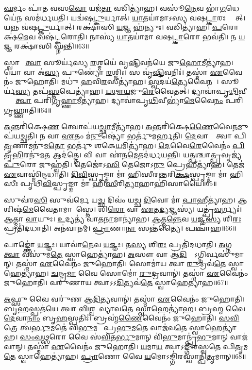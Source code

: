 \ul{𑌘}𑌰𑍍𑌮𑌂 𑌪𑌾॑𑌤 𑌵𑌸\ul{𑌵𑍋} 𑌯𑌜॑\ul{𑌤𑌾} 𑌵𑌡𑌿𑌤𑍍𑌯𑌾॑𑌹। 
𑌵𑌸𑍂॑\ul{𑌨𑍇}𑌵 𑌭𑌾॑\ul{𑌗}𑌧𑍇𑌯𑍇॑\ul{𑌨} 𑌸𑌮॑𑌰𑍍𑌧𑌯𑌤𑌿। 
𑌯𑌦𑍍𑌵॑𑌷\ul{𑌟𑍍𑌕𑍁}𑌰𑍍𑌯𑌾𑌤𑍍। 
\ul{𑌯𑌾}𑌤𑌯𑌾॑𑌮𑌾𑌽𑌸𑍍𑌯 𑌵𑌷\ul{𑌟𑍍𑌕𑌾}𑌰𑌃 𑌸𑍍𑌯𑌾᳚𑌤𑍍। 
𑌯𑌨𑍍𑌨 𑌵॑𑌷\ul{𑌟𑍍𑌕𑍁}𑌰𑍍𑌯𑌾𑌤𑍍। 
𑌰𑌕𑍍𑌷𑌾॑𑌸𑌿 \ul{𑌯}𑌜𑍍𑌞 𑌹॑𑌨𑍍𑌯𑍁𑌃। 
𑌵𑌡𑌿𑌤𑍍𑌯𑌾॑𑌹। 
\ul{𑌪}𑌰𑍋𑌕𑍍𑌷॑\ul{𑌮𑍇}𑌵 𑌵𑌷॑𑌟𑍍𑌕𑌰𑍋𑌤𑌿। 
𑌨𑌾𑌸𑍍𑌯॑ \ul{𑌯𑌾}𑌤𑌯𑌾॑𑌮𑌾 𑌵𑌷\ul{𑌟𑍍𑌕𑌾}𑌰𑍋 𑌭𑌵॑𑌤𑌿। 
𑌨 \ul{𑌯}𑌜𑍍𑌞 𑌰𑌕𑍍𑌷𑌾॑𑌸𑌿 𑌘𑍍𑌨𑌨𑍍𑌤𑌿॥63॥

𑌸𑍍𑌵𑌾𑌹𑌾᳚ \ul{𑌤𑍍𑌵𑌾} 𑌸𑍂𑌰𑍍𑌯॑𑌸𑍍𑌯 \ul{𑌰}𑌶𑍍𑌮𑌯𑍇॑ 𑌵𑍃\ul{𑌷𑍍𑌟𑌿}𑌵𑌨॑𑌯𑍇 𑌜𑍁\ul{𑌹𑍋}𑌮𑍀𑌤𑍍𑌯𑌾॑𑌹। 
𑌯𑍋 𑌵𑌾 𑌅॑\ul{𑌸𑍍𑌯} 𑌪𑍁𑌣𑍍𑌯𑍋॑ \ul{𑌰}𑌶𑍍𑌮𑌿𑌃। 
𑌸 𑌵𑍃॑\ul{𑌷𑍍𑌟𑌿}𑌵𑌨𑌿𑌃॑। 
𑌤𑌸𑍍𑌮𑌾॑ \ul{𑌏}𑌵𑍈𑌨𑌂॑ 𑌜𑍁𑌹𑍋𑌤𑌿। 
𑌮𑌧𑍁॑ \ul{𑌹}𑌵𑌿\ul{𑌰}𑌸𑍀𑌤𑍍𑌯𑌾॑𑌹। 
\ul{𑌸𑍍𑌵}𑌦𑌯॑\ul{𑌤𑍍𑌯𑍇}𑌵𑍈𑌨𑌮𑍍᳚। 
𑌸𑍂𑌰𑍍𑌯॑\ul{𑌸𑍍𑌯} 𑌤𑌪॑\ul{𑌸𑍍𑌤}𑌪𑍇𑌤𑍍𑌯𑌾॑𑌹। 
\ul{𑌯}\ul{𑌥𑌾}\ul{𑌯}𑌜𑍁\ul{𑌰𑍇}𑌵𑍈𑌤𑌤𑍍। 
𑌦𑍍𑌯𑌾𑌵𑌾॑𑌪𑍃\ul{𑌥𑌿}𑌵𑍀𑌭𑍍𑌯𑌾𑌂᳚ \ul{𑌤𑍍𑌵𑌾} 𑌪𑌰𑌿॑𑌗𑍃\ul{𑌹𑍍𑌣𑌾}𑌮𑍀𑌤𑍍𑌯𑌾॑𑌹। 
𑌦𑍍𑌯𑌾𑌵𑌾॑𑌪𑍃\ul{𑌥𑌿}𑌵𑍀𑌭𑍍𑌯𑌾॑\ul{𑌮𑍇}𑌵𑍈\ul{𑌨𑌂} 𑌪𑌰𑌿॑𑌗𑍃𑌹𑍍𑌣𑌾𑌤𑌿॥64॥

\ul{𑌅}𑌨𑍍𑌤𑌰𑌿॑𑌕𑍍𑌷𑍇\ul{𑌣} 𑌤𑍍𑌵𑍋𑌪॑𑌯\ul{𑌚𑍍𑌛𑌾}𑌮𑍀𑌤𑍍𑌯𑌾॑𑌹। 
\ul{𑌅}𑌨𑍍𑌤𑌰𑌿॑𑌕𑍍𑌷𑍇\ul{𑌣𑍈}𑌵𑍈\ul{𑌨}𑌮𑍁𑌪॑𑌯𑌚𑍍𑌛𑌤𑌿। 
𑌨 𑌵𑌾 \ul{𑌏}𑌤𑌂 𑌮॑\ul{𑌨𑍁}𑌷𑍍𑌯𑍋॑ 𑌭𑌰𑍍𑌤𑍁॑𑌮𑌰𑍍\mbox{}𑌹𑌤𑌿। 
\ul{𑌦𑍇}𑌵𑌾𑌨𑌾𑌂᳚ 𑌤𑍍𑌵𑌾 𑌪𑌿\ul{𑌤𑍃}𑌣𑌾𑌮𑌨𑍁॑𑌮\ul{𑌤𑍋} 𑌭𑌰𑍍𑌤𑍁॑ 𑌶𑌕𑍇\ul{𑌯}𑌮𑌿𑌤𑍍𑌯𑌾॑𑌹। 
\ul{𑌦𑍇}𑌵𑍈\ul{𑌰𑍇}𑌵𑍈𑌨𑌂॑ \ul{𑌪𑌿}𑌤𑍃\ul{𑌭𑌿}𑌰𑌨𑍁॑𑌮\ul{𑌤} 𑌆𑌦॑𑌤𑍍𑌤𑍇। 
𑌵𑌿 𑌵𑌾 𑌏॑𑌨\ul{𑌮𑍇}𑌤𑌦॑𑌰𑍍𑌧𑌯𑌨𑍍𑌤𑌿। 
𑌯\ul{𑌤𑍍𑌪}𑌶𑍍𑌚𑌾\ul{𑌤𑍍𑌪𑍍𑌰}𑌵𑍃𑌜𑍍𑌯॑ \ul{𑌪𑍁}𑌰𑍋 𑌜𑍁𑌹𑍍𑌵॑𑌤𑌿। 
𑌤𑍇𑌜𑍋॑𑌽\ul{𑌸𑌿} 𑌤𑍇𑌜𑍋𑌽\ul{𑌨𑍁} 𑌪𑍍𑌰𑍇𑌹𑍀𑌤𑍍𑌯𑌾॑𑌹। 
𑌤𑍇𑌜॑ \ul{𑌏}𑌵𑌾𑌸𑍍𑌮𑌿॑𑌨𑍍𑌦𑌧𑌾𑌤𑌿। 
\ul{𑌦𑌿}\ul{𑌵𑌿}𑌸𑍍𑌪𑍃𑌙𑍍𑌮𑌾 𑌮𑌾॑ 𑌹𑌿𑌸𑍀𑌰𑌨𑍍𑌤𑌰𑌿\ul{𑌕𑍍𑌷}𑌸𑍍𑌪𑍃𑌙𑍍𑌮𑌾 𑌮𑌾॑ 𑌹𑌿𑌸𑍀𑌃 𑌪𑍃𑌥𑌿\ul{𑌵𑌿}𑌸𑍍𑌪𑍃𑌙𑍍𑌮𑌾 𑌮𑌾॑ 𑌹𑌿\ul{𑌸𑍀}𑌰𑌿\ul{𑌤𑍍𑌯𑌾}𑌹𑌾𑌹𑌿॑𑌸𑌾𑌯𑍈॥65॥

𑌸𑍁𑌵॑𑌰\ul{𑌸𑌿} 𑌸𑍁𑌵॑𑌰𑍍𑌮𑍇 𑌯\ul{𑌚𑍍𑌛} 𑌦𑌿𑌵𑌂॑ 𑌯𑌚𑍍𑌛 \ul{𑌦𑌿}𑌵𑍋 𑌮𑌾॑ \ul{𑌪𑌾}𑌹𑍀𑌤𑍍𑌯𑌾॑𑌹। 
\ul{𑌆}𑌶𑌿𑌷॑\ul{𑌮𑍇}𑌵𑍈𑌤𑌾𑌮𑌾𑌶𑌾᳚𑌸𑍍𑌤𑍇। 
𑌶𑌿\ul{𑌰𑍋} 𑌵𑌾 \ul{𑌏}𑌤\ul{𑌦𑍍𑌯}𑌜𑍍𑌞𑌸𑍍𑌯॑। 
𑌯𑌤𑍍𑌪𑍍𑌰॑\ul{𑌵}𑌰𑍍𑌗𑍍𑌯𑌃॑। 
\ul{𑌆}𑌤𑍍𑌮𑌾 \ul{𑌵𑌾}𑌯𑍁𑌃। 
\ul{𑌉}𑌦𑍍𑌯𑌤𑍍𑌯॑ 𑌵𑌾𑌤\ul{𑌨𑌾}𑌮𑌾𑌨𑍍𑌯𑌾॑𑌹। 
\ul{𑌆}𑌤𑍍𑌮\ul{𑌨𑍍𑌨𑍇}𑌵 \ul{𑌯}𑌜𑍍𑌞\ul{𑌸𑍍𑌯} 𑌶𑌿\ul{𑌰𑌃} 𑌪𑍍𑌰𑌤𑌿॑𑌦𑌧𑌾𑌤𑌿। 
𑌅𑌨॑𑌵𑌾𑌨𑌮𑍍। 
\ul{𑌪𑍍𑌰𑌾}𑌣𑌾\ul{𑌨𑌾}\ul{} 𑌸𑌨𑍍𑌤॑𑌤𑍍𑌯𑍈। 
𑌪𑌞𑍍𑌚𑌾॑𑌹॥66॥

𑌪𑌾𑌙𑍍𑌕𑍍𑌤𑍋॑ \ul{𑌯}𑌜𑍍𑌞𑌃। 
𑌯𑌾𑌵𑌾॑\ul{𑌨𑍇}𑌵 \ul{𑌯}𑌜𑍍𑌞𑌃। 
𑌤\ul{𑌸𑍍𑌯} 𑌶𑌿\ul{𑌰𑌃} 𑌪𑍍𑌰𑌤𑌿॑𑌦𑌧𑌾𑌤𑌿। 
\ul{𑌅}𑌗𑍍𑌨𑌯𑍇᳚ \ul{𑌤𑍍𑌵𑌾} 𑌵𑌸𑍁॑𑌮\ul{𑌤𑍇} 𑌸𑍍𑌵𑌾𑌹𑍇𑌤𑍍𑌯𑌾॑𑌹। 
\ul{𑌅}𑌸𑍗 𑌵𑌾 𑌆॑\ul{𑌦𑌿}𑌤𑍍𑌯𑍋᳚𑌽𑌗𑍍𑌨𑌿𑌰𑍍𑌵𑌸𑍁॑𑌮𑌾𑌨𑍍। 
𑌤𑌸𑍍𑌮𑌾॑ \ul{𑌏}𑌵𑍈𑌨𑌂॑ 𑌜𑍁𑌹𑍋𑌤𑌿। 
𑌸𑍋𑌮𑌾॑𑌯 𑌤𑍍𑌵𑌾 \ul{𑌰𑍁}𑌦𑍍𑌰𑌵॑\ul{𑌤𑍇} 𑌸𑍍𑌵𑌾𑌹𑍇𑌤𑍍𑌯𑌾॑𑌹। 
\ul{𑌚}𑌨𑍍𑌦𑍍𑌰\ul{𑌮𑌾} 𑌵𑍈 𑌸𑍋𑌮𑍋॑ \ul{𑌰𑍁}𑌦𑍍𑌰𑌵𑌾𑌨𑍍॑। 
𑌤𑌸𑍍𑌮𑌾॑ \ul{𑌏}𑌵𑍈𑌨𑌂॑ 𑌜𑍁𑌹𑍋𑌤𑌿। 
𑌵𑌰𑍁॑𑌣𑌾𑌯 𑌤𑍍𑌵𑌾𑌽𑌽\ul{𑌦𑌿}𑌤𑍍𑌯𑌵॑\ul{𑌤𑍇} 𑌸𑍍𑌵𑌾𑌹𑍇𑌤𑍍𑌯𑌾॑𑌹॥67॥

\ul{𑌅}𑌫𑍍𑌸𑍁 𑌵𑍈 𑌵𑌰𑍁॑𑌣 𑌆\ul{𑌦𑌿}𑌤𑍍𑌯𑌵𑌾𑌨𑍍॑। 
𑌤𑌸𑍍𑌮𑌾॑ \ul{𑌏}𑌵𑍈𑌨𑌂॑ 𑌜𑍁𑌹𑍋𑌤𑌿। 
𑌬𑍃\ul{𑌹}𑌸𑍍𑌪𑌤॑𑌯𑍇 𑌤𑍍𑌵𑌾 \ul{𑌵𑌿}𑌶𑍍𑌵𑌦𑍇᳚𑌵𑍍𑌯𑌾𑌵\ul{𑌤𑍇} 𑌸𑍍𑌵𑌾𑌹𑍇𑌤𑍍𑌯𑌾॑𑌹। 
𑌬𑍍𑌰\ul{𑌹𑍍𑌮} 𑌵𑍈 \ul{𑌦𑍇}𑌵𑌾\ul{𑌨𑌾𑌂} 𑌬𑍃\ul{𑌹}𑌸𑍍𑌪𑌤𑌿𑌃॑। 
𑌬𑍍𑌰𑌹𑍍𑌮॑\ul{𑌣𑍈}𑌵𑍈𑌨𑌂॑ 𑌜𑍁𑌹𑍋𑌤𑌿। 
\ul{𑌸}\ul{𑌵𑌿}𑌤𑍍𑌰𑍇 𑌤𑍍𑌵॑\ul{𑌰𑍍𑌭𑍁}𑌮𑌤𑍇॑ 𑌵𑌿\ul{𑌭𑍁}𑌮𑌤𑍇᳚ 𑌪𑍍𑌰\ul{𑌭𑍁}𑌮\ul{𑌤𑍇} 𑌵𑌾𑌜॑𑌵\ul{𑌤𑍇} 𑌸𑍍𑌵𑌾𑌹𑍇𑌤𑍍𑌯𑌾॑𑌹। 
\ul{𑌸𑌂}\ul{𑌵}\ul{𑌥𑍍𑌸}𑌰𑍋 𑌵𑍈 𑌸॑\ul{𑌵𑌿}𑌤\ul{𑌰𑍍𑌭𑍁}𑌮𑌾𑌨𑍍 𑌵𑌿॑\ul{𑌭𑍁}𑌮𑌾𑌨𑍍𑌪𑍍𑌰॑\ul{𑌭𑍁}𑌮𑌾𑌨𑍍 𑌵𑌾𑌜॑𑌵𑌾𑌨𑍍। 
𑌤𑌸𑍍𑌮𑌾॑ \ul{𑌏}𑌵𑍈𑌨𑌂॑ 𑌜𑍁𑌹𑍋𑌤𑌿। 
\ul{𑌯}𑌮𑌾\ul{𑌯} 𑌤𑍍𑌵𑌾𑌽𑌙𑍍𑌗𑌿॑𑌰𑌸𑍍𑌵𑌤𑍇 𑌪𑌿\ul{𑌤𑍃}𑌮\ul{𑌤𑍇} 𑌸𑍍𑌵𑌾𑌹𑍇𑌤𑍍𑌯𑌾॑𑌹। 
\ul{𑌪𑍍𑌰𑌾}𑌣𑍋 𑌵𑍈 \ul{𑌯}𑌮𑍋𑌽𑌙𑍍𑌗𑌿॑𑌰𑌸𑍍𑌵𑌾𑌨𑍍𑌪𑌿\ul{𑌤𑍃}𑌮𑌾𑌨𑍍॥68॥


